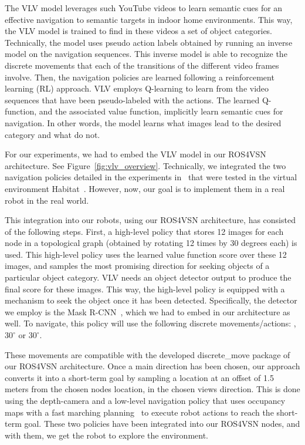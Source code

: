 The VLV model leverages such YouTube videos to learn semantic cues for an effective navigation to semantic targets in indoor home environments.
This way, the VLV model is trained to find in these videos a set of object categories.
Technically, the model uses pseudo action labels obtained by running an inverse model on the navigation sequences.
This inverse model is able to recognize the discrete movements that each of the transitions of the different video frames involve.
Then, the navigation policies are learned following a reinforcement learning (RL) approach.
VLV employs Q-learning to learn from the video sequences that have been pseudo-labeled with the actions.
The learned Q-function, and the associated value function, implicitly learn semantic cues for navigation.
In other words, the model learns what images lead to the desired category and what do not.

For our experiments, we had to embed the VLV model in our ROS4VSN architecture.
See Figure~\ref{fig:vlv_overview}.
Technically, we integrated the two navigation policies detailed in the experiments in~\cite{chang2020} that were tested in the virtual environment Habitat~\cite{NEURIPS2021_021bbc7e}.
However, now, our goal is to implement them in a real robot in the real world.

This integration into our robots, using our ROS4VSN architecture, has consisted of the following steps.
First, a high-level policy that stores 12 images for each node in a topological graph (obtained by rotating 12 times by 30 degrees each) is used.
This high-level policy uses the learned value function score over these 12 images, and samples the most promising direction for seeking objects of a particular object category.
VLV needs an object detector output to produce the final score for these images.
This way, the high-level policy is equipped with a mechanism to seek the object once it has been detected.
Specifically, the detector we employ is the Mask R-CNN~\cite{mask-rcnn}, which we had to embed in our architecture as well.
To navigate, this policy will use the following discrete movements/actions: \moveforward 25cm, \turnright $30^\circ$ or \turnleft $30^\circ$.

These movements are compatible with the developed discrete\_move package of our ROS4VSN architecture.
Once a main direction has been chosen, our approach converts it into a short-term goal by sampling a location at an offset of 1.5 meters from the chosen node\textquotesingle s location, in the chosen view\textquotesingle s direction.
This is done using the depth-camera and a low-level navigation policy that uses occupancy maps with a fast marching planning~\cite{Sethian1996} to execute robot actions to reach the short-term goal.
These two policies have been integrated into our ROS4VSN nodes, and with them, we get the robot to explore the environment.

